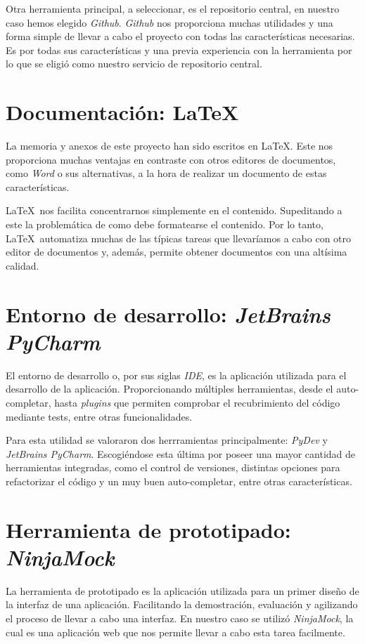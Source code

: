 Otra herramienta principal, a seleccionar, es el repositorio central, en nuestro caso hemos elegido \textit{Github}. \textit{Github} nos proporciona muchas utilidades y una forma simple de llevar a cabo el proyecto con todas las características necesarias. Es por todas sus características y una previa experiencia con la herramienta por lo que se eligió como nuestro servicio de repositorio central.

\section{Documentación: \LaTeX}

La memoria y anexos de este proyecto han sido escritos en \LaTeX. Este nos proporciona muchas ventajas en contraste con otros editores de documentos, como \textit{Word} o sus alternativas, a la hora de realizar un documento de estas características.

\LaTeX\ nos facilita concentrarnos simplemente en el contenido. Supeditando a este la problemática de como debe formatearse el contenido. Por lo tanto, \LaTeX\ automatiza muchas de las típicas tareas que llevaríamos a cabo con otro editor de documentos y, además, permite obtener documentos con una altísima calidad.

\section{Entorno de desarrollo: \textit{JetBrains PyCharm}}

El entorno de desarrollo o, por sus siglas \textit{IDE}, es la aplicación utilizada para el desarrollo de la aplicación. Proporcionando múltiples herramientas, desde el auto-completar, hasta \textit{plugins} que permiten comprobar el recubrimiento del código mediante tests, entre otras funcionalidades.

Para esta utilidad se valoraron dos herrramientas principalmente: \textit{PyDev} y \textit{JetBrains PyCharm}. Escogiéndose esta última por poseer una mayor cantidad de herramientas integradas, como el control de versiones, distintas opciones para refactorizar el código y un muy buen auto-completar, entre otras características.

\section{Herramienta de prototipado: \textit{NinjaMock}}

La herramienta de prototipado es la aplicación utilizada para un primer diseño de la interfaz de una aplicación. Facilitando la demostración, evaluación y agilizando el proceso de llevar a cabo una interfaz. En nuestro caso se utilizó \textit{NinjaMock}, la cual es una aplicación web que nos permite llevar a cabo esta tarea facilmente.